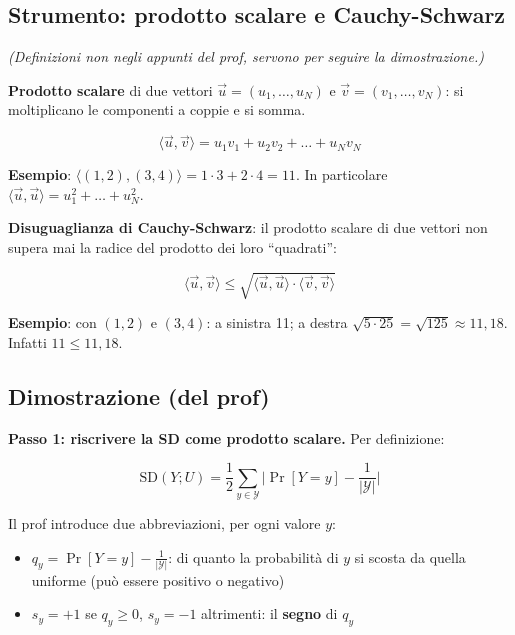 \subsection{Strumento: prodotto scalare e Cauchy-Schwarz}

\emph{(Definizioni non negli appunti del prof, servono per seguire la dimostrazione.)}

\textbf{Prodotto scalare} di due vettori \(\vec{u} = (u_1, \dots, u_N)\) e \(\vec{v} = (v_1, \dots, v_N)\): si moltiplicano le componenti a coppie e si somma.

\[
\langle \vec{u}, \vec{v} \rangle = u_1 v_1 + u_2 v_2 + \dots + u_N v_N
\]

\begin{esempio}

\textbf{Esempio}: \(\langle (1, 2), (3, 4) \rangle = 1 \cdot 3 + 2 \cdot 4 = 11\). In particolare \(\langle \vec{u}, \vec{u} \rangle = u_1^2 + \dots + u_N^2\).

\end{esempio}

\textbf{Disuguaglianza di Cauchy-Schwarz}: il prodotto scalare di due vettori non supera mai la radice del prodotto dei loro ``quadrati'':

\[
\langle \vec{u}, \vec{v} \rangle \le \sqrt{\langle \vec{u}, \vec{u} \rangle \cdot \langle \vec{v}, \vec{v} \rangle}
\]

\begin{esempio}

\textbf{Esempio}: con \((1, 2)\) e \((3, 4)\): a sinistra 11; a destra \(\sqrt{5 \cdot 25} = \sqrt{125} \approx 11{,}18\). Infatti \(11 \le 11{,}18\).

\end{esempio}

\subsection{Dimostrazione (del prof)}

\textbf{Passo 1: riscrivere la SD come prodotto scalare.} Per definizione:

\[
\text{SD}(Y; U) = \frac{1}{2} \sum_{y \in \mathcal{Y}} \Big| \Pr[Y = y] - \frac{1}{|\mathcal{Y}|} \Big|
\]

Il prof introduce due abbreviazioni, per ogni valore \(y\):

\begin{itemize}
\tightlist
\item
  \(q_y = \Pr[Y = y] - \frac{1}{|\mathcal{Y}|}\): di quanto la probabilità di \(y\) si scosta da quella uniforme (può essere positivo o negativo)
\item
  \(s_y = +1\) se \(q_y \ge 0\), \(s_y = -1\) altrimenti: il \textbf{segno} di \(q_y\)
\end{itemize}

